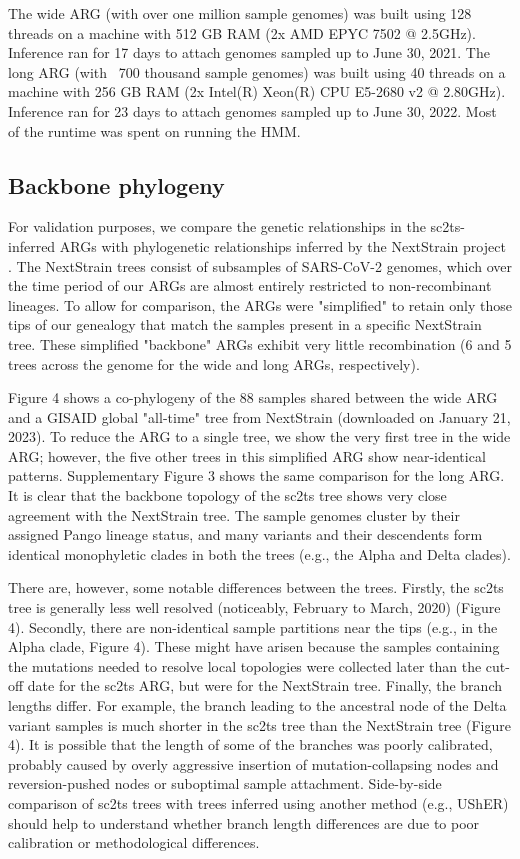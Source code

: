 \documentclass{article}
\begin{document}
The wide ARG (with over one million sample genomes) was built using 128 threads on a machine with 512 GB RAM (2x AMD EPYC 7502 @ 2.5GHz). Inference ran for 17 days to attach genomes sampled up to June 30, 2021. The long ARG (with ~700 thousand sample genomes) was built using 40 threads on a machine with 256 GB RAM (2x Intel(R) Xeon(R) CPU E5-2680 v2 @ 2.80GHz). Inference ran for 23 days to attach genomes sampled up to June 30, 2022. Most of the runtime was spent on running the HMM.

\subsection{Backbone phylogeny}

For validation purposes, we compare the genetic relationships in the sc2ts-inferred ARGs with phylogenetic relationships inferred by the NextStrain project \cite{Hadfield2018-ef}. The NextStrain trees consist of subsamples of SARS-CoV-2 genomes, which over the time period of our ARGs are almost entirely restricted to non-recombinant lineages. To allow for comparison, the ARGs were "simplified" \cite{Kelleher2018-xc} to retain only those tips of our genealogy that match the samples present in a specific NextStrain tree. These simplified "backbone" ARGs exhibit very little recombination (6 and 5 trees across the genome for the wide and long ARGs, respectively).

Figure 4 shows a co-phylogeny of the 88 samples shared between the wide ARG and a GISAID global "all-time" tree from NextStrain (downloaded on January 21, 2023). To reduce the ARG to a single tree, we show the very first tree in the wide ARG; however, the five other trees in this simplified ARG show near-identical patterns. Supplementary Figure 3 shows the same comparison for the long ARG. It is clear that the backbone topology of the sc2ts tree shows very close agreement with the NextStrain tree. The sample genomes cluster by their assigned Pango lineage status, and many variants and their descendents form identical monophyletic clades in both the trees (e.g., the Alpha and Delta clades).

There are, however, some notable differences between the trees. Firstly, the sc2ts tree is generally less well resolved (noticeably, February to March, 2020) (Figure 4). Secondly, there are non-identical sample partitions near the tips (e.g., in the Alpha clade, Figure 4). These might have arisen because the samples containing the mutations needed to resolve local topologies were collected later than the cut-off date for the sc2ts ARG, but were for the NextStrain tree. Finally, the branch lengths differ. For example, the branch leading to the ancestral node of the Delta variant samples is much shorter in the sc2ts tree than the NextStrain tree (Figure 4). It is possible that the length of some of the branches was poorly calibrated, probably caused by overly aggressive insertion of mutation-collapsing nodes and reversion-pushed nodes or suboptimal sample attachment. Side-by-side comparison of sc2ts trees with trees inferred using another method (e.g., UShER) should help to understand whether branch length differences are due to poor calibration or methodological differences.
\end{document}

